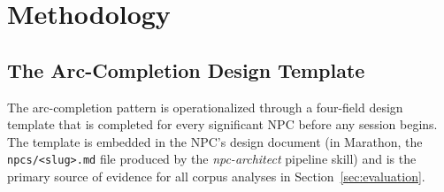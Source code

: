 
\section{Methodology}
\label{sec:methodology}

\subsection{The Arc-Completion Design Template}

The arc-completion pattern is operationalized through a four-field design
template that is completed for every significant NPC before any session
begins. The template is embedded in the NPC's design document (in Marathon,
the \texttt{npcs/<slug>.md} file produced by the \textit{npc-architect}
pipeline skill) and is the primary source of evidence for all corpus analyses
in Section~\ref{sec:evaluation}.

